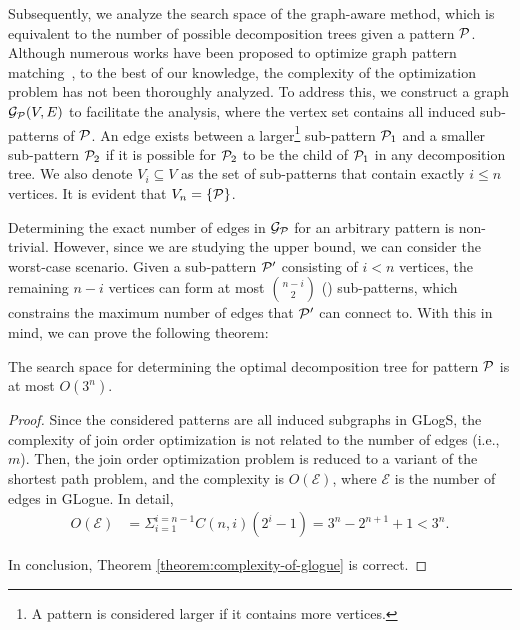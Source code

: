 Subsequently, we analyze the search space of the graph-aware method, which is equivalent to the number of possible decomposition trees given a pattern $\mathcal{P}$. Although numerous works have been proposed to optimize graph pattern matching~\cite{huge,GLogS,mhedhbi2019optimizing}, to the best of our knowledge, the complexity of the optimization problem has not been thoroughly analyzed. To address this, we construct a graph $\mathcal{G}_{\mathcal{P}}(V, E)$ to facilitate the analysis, where the vertex set contains all induced sub-patterns of $\mathcal{P}$. An edge exists between a larger\footnote{A pattern is considered larger if it contains more vertices.} sub-pattern $\mathcal{P}_1$ and a smaller sub-pattern $\mathcal{P}_2$ if it is possible for $\mathcal{P}_2$ to be the child of $\mathcal{P}_1$ in any decomposition tree. We also denote $V_i \subseteq V$ as the set of sub-patterns that contain exactly $i \leq n$ vertices. It is evident that $V_n = \{\mathcal{P}\}$.

Determining the exact number of edges in $\mathcal{G}_{\mathcal{P}}$ for an arbitrary pattern is non-trivial. However, since we are studying the upper bound, we can consider the worst-case scenario. Given a sub-pattern $\mathcal{P}'$ consisting of $i < n$ vertices, the remaining $n-i$ vertices can form at most $\binom{n-i}{2}$ () sub-patterns, which constrains the maximum number of edges that $\mathcal{P}'$ can connect to. With this in mind, we can prove the following theorem:

\begin{theorem} \label{theorem:complexity-of-graph-aware}
The search space for determining the optimal decomposition tree for pattern $\mathcal{P}$ is at most $O(3^n)$.
\end{theorem}

\begin{proof}
    Since the considered patterns are all induced subgraphs in GLogS, the complexity of join order optimization is not related to the number of edges (i.e., $m$).
    Then, the join order optimization problem is reduced to a variant of the shortest path problem, and the complexity is $O(\mathcal{E})$, where $\mathcal{E}$ is the number of edges in GLogue.
    In detail,
    \begin{equation*}
        \begin{split}
            O(\mathcal{E}) & = \Sigma_{i=1}^{i=n-1}C(n, i)(2^i - 1) = 3^n - 2^{n+1} +1 < 3^n.
        \end{split}
    \end{equation*}

    In conclusion, Theorem \ref{theorem:complexity-of-glogue} is correct.

\end{proof}

